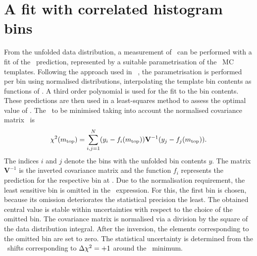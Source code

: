 \section{A fit with correlated histogram bins}
\label{sect:unffit}
%
From the unfolded data distribution, a measurement of \mt\ can be performed with a fit of the \truelevel\ prediction, represented by a suitable parametrisation of the \truelevel\ \gls{MC} templates. 
%
Following the approach used in ~\cite{ATLAS:2014zza}, the parametrisation is performed per bin using normalised distributions, interpolating the template bin contents as functions of \mt. A third order polynomial is used for the fit to the bin contents. These predictions are then used in a least-squares method to assess the optimal value of \mt. The \chiq\ to be minimised taking into account the normalised covariance matrix~\cite{CowanBook} is
%
\[
\chi^2(m_{\mathrm{top}})=\sum^N_{i,j=1} (y_i-f_i(m_{\mathrm{top}})) \mathbf{V}^{-1} (y_j-f_j(m_{\mathrm{top}})).
\]
%
The indices $i$ and $j$ denote the bins with the unfolded bin contents $y$. The matrix $\mathbf{V}^{-1}$ is the inverted covariance matrix and the function $f_i$ represents the prediction for the respective bin at \truelevel. Due to the normalisation requirement, the least sensitive bin is omitted in the \chiq\ expression. For this, the first bin is chosen, because its omission deteriorates the statistical precision the least. 
%
The obtained central value is stable within uncertainties with respect to the choice of the omitted bin. 
%
The covariance matrix is normalised via a division by the square of the data distribution integral. After the inversion, the elements corresponding to the omitted bin are set to zero.
%
The statistical uncertainty is determined from the \mt\ shifts corresponding to $\Delta\chi^2=+1$ around the \chiq\ minimum.






















